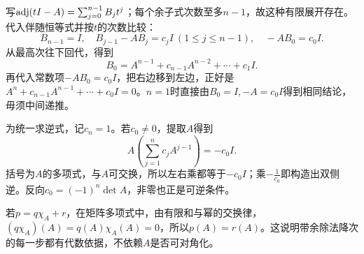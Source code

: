 \label{der:8-2}
写$\operatorname{adj}(tI-A)=\sum_{j=0}^{n-1}B_jt^j$；每个余子式次数至多$n-1$，故这种有限展开存在。代入伴随恒等式并按$t$的次数比较：
\[B_{n-1}=I,\quad B_{j-1}-AB_j=c_jI\ (1\le j\le n-1),\quad -AB_0=c_0I.\]
从最高次往下回代，得到
\[B_0=A^{n-1}+c_{n-1}A^{n-2}+\cdots+c_1I.\]
再代入常数项$-AB_0=c_0I$，把右边移到左边，正好是$A^n+c_{n-1}A^{n-1}+\cdots+c_0I=0$。$n=1$时直接由$B_0=I,-A=c_0I$得到相同结论，毋须中间递推。

为统一求逆式，记$c_n=1$。若$c_0\ne0$，提取$A$得到
\[A\left(\sum_{j=1}^n c_jA^{j-1}\right)=-c_0I.\]
括号为$A$的多项式，与$A$可交换，所以左右乘都等于$-c_0I$；乘$-\frac{1}{c_0}$即构造出双侧逆。反向$c_0=(-1)^n\det A$，非零也正是可逆条件。

若$p=q\chi_A+r$，在矩阵多项式中，由有限和与幂的交换律，$(q\chi_A)(A)=q(A)\chi_A(A)=0$，所以$p(A)=r(A)$。这说明带余除法降次的每一步都有代数依据，不依赖$A$是否可对角化。
